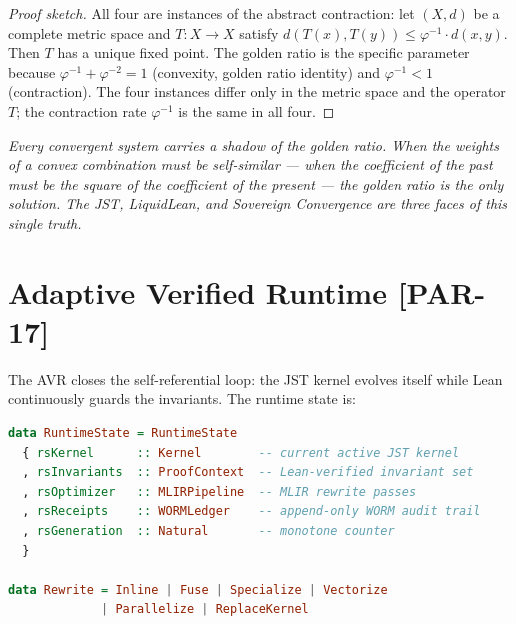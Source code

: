 \documentclass[12pt, letterpaper]{article}
\theoremstyle{plain}
\theoremstyle{definition}
\theoremstyle{remark}
\newcommand{\phiinv}{\varphi^{-1}}
\newcommand{\phiinvsq}{\varphi^{-2}}
\newcommand{\prior}[1]{\textcolor{SovGold}{\textbf{[PAR-#1]}}}
\begin{document}
\begin{proof}[Proof sketch]
All four are instances of the abstract contraction: let $(X, d)$ be a complete
metric space and $T: X \to X$ satisfy $d(T(x), T(y)) \leq \phiinv \cdot d(x, y)$.
Then $T$ has a unique fixed point. The golden ratio is the specific parameter
because $\phiinv + \phiinvsq = 1$ (convexity, golden ratio identity) and
$\phiinv < 1$ (contraction). The four instances differ only in the metric space
and the operator $T$; the contraction rate $\phiinv$ is the same in all four.
\end{proof}

\begin{noveltybox}[title={The Parr Philosophy}]
\textit{Every convergent system carries a shadow of the golden ratio.
When the weights of a convex combination must be self-similar
--- when the coefficient of the past must be the square of the coefficient of the present ---
the golden ratio is the only solution.
The JST, LiquidLean, and Sovereign Convergence are three faces of this single truth.}
\end{noveltybox}

\section{Adaptive Verified Runtime \prior{17}}

The AVR closes the self-referential loop: the JST kernel evolves itself
while Lean continuously guards the invariants. The runtime state is:

\begin{lstlisting}[language=Haskell, caption={RuntimeState --- the self-modifying kernel}]
data RuntimeState = RuntimeState
  { rsKernel      :: Kernel        -- current active JST kernel
  , rsInvariants  :: ProofContext  -- Lean-verified invariant set
  , rsOptimizer   :: MLIRPipeline  -- MLIR rewrite passes
  , rsReceipts    :: WORMLedger    -- append-only WORM audit trail
  , rsGeneration  :: Natural       -- monotone counter
  }

data Rewrite = Inline | Fuse | Specialize | Vectorize
             | Parallelize | ReplaceKernel
\end{lstlisting}
\end{document}
